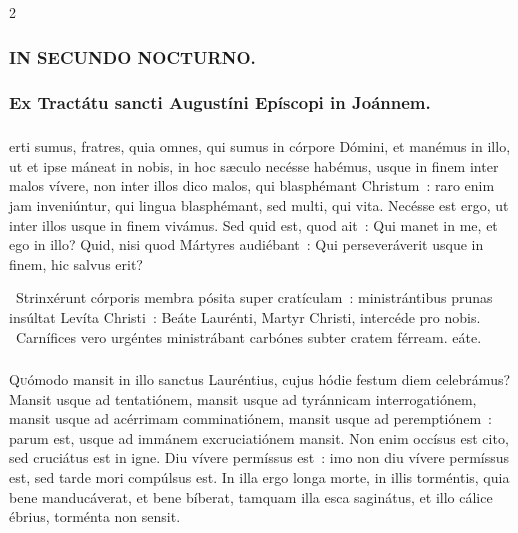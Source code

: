 \documentclass[9pt,twoside]{extarticle}
\begin{document}
\begin{multicols}{2}
\subsubsection*{\center \textsc{IN SECUNDO NOCTURNO.}}
\subsubsection*{\center Ex Tractátu sancti Augustíni Epíscopi in Joánnem.}
\subsubsection*{\center {}}
erti sumus, fratres, quia omnes, qui sumus in córpore Dómini, et manémus in illo, ut et ipse máneat in nobis, in hoc sæculo necésse habémus, usque in finem inter malos vívere, non inter illos dico malos, qui blasphémant Christum~: raro enim jam inveniúntur, qui lingua blasphémant, sed multi, qui vita. Necésse est ergo, ut inter illos usque in finem vivámus. Sed quid est, quod ait~: Qui manet in me, et ego in illo?  Quid, nisi quod Mártyres audiébant~: Qui perseveráverit usque in finem, hic salvus erit?

\begin{tightlist}{}
\item {}~Strinxérunt córporis membra pósita super cratículam~: ministrántibus prunas insúltat Levíta Christi~: \textred{*} Beáte Laurénti, Martyr Christi, intercéde pro nobis.
~Carnífices vero urgéntes ministrábant carbónes subter cratem férream. eáte.
\end{tightlist}

\subsubsection*{\center {}}
\lettrine{Q}uómodo mansit in illo sanctus Lauréntius, cujus hódie festum diem celebrámus? Mansit usque ad tentatiónem, mansit usque ad tyránnicam interrogatiónem, mansit usque ad acérrimam comminatiónem, mansit usque ad peremptiónem~: parum est, usque ad immánem excruciatiónem mansit. Non enim occísus est cito, sed cruciátus est in igne. Diu vívere permíssus est~: imo non diu vívere permíssus est, sed tarde mori compúlsus est. In illa ergo longa morte, in illis torméntis, quia bene manducáverat, et bene bíberat, tamquam illa esca saginátus, et illo cálice ébrius, torménta non sensit.


\end{multicols}
\end{document}
